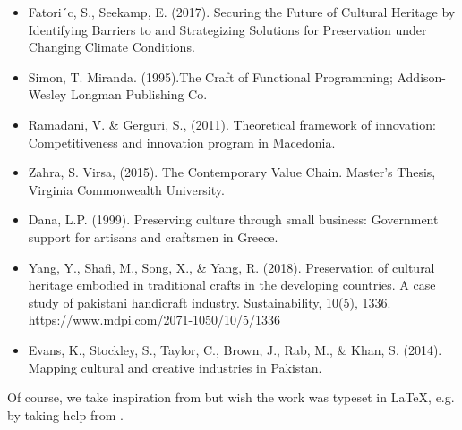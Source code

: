 \begin{itemize}
\item Fatori´c, S., Seekamp, E. (2017). Securing the Future of Cultural Heritage by Identifying Barriers to and Strategizing Solutions for Preservation under Changing Climate Conditions. 

\item Simon, T. Miranda. (1995).The Craft of Functional Programming; Addison-Wesley Longman Publishing Co.

\item Ramadani, V. \& Gerguri, S., (2011).  Theoretical framework of innovation: Competitiveness and innovation program in Macedonia.

\item Zahra, S. Virsa, (2015). The Contemporary Value Chain. Master’s Thesis, Virginia Commonwealth University.

\item Dana, L.P. (1999). Preserving culture through small business: Government support for artisans and craftsmen in Greece. 

\item Yang, Y., Shafi, M., Song, X., \& Yang, R. (2018). Preservation of cultural heritage embodied in traditional crafts in the developing countries. A case study of pakistani handicraft industry. Sustainability, 10(5), 1336. https://www.mdpi.com/2071-1050/10/5/1336

\item Evans, K., Stockley, S., Taylor, C., Brown, J., Rab, M., \& Khan, S. (2014). Mapping cultural and creative industries in Pakistan. 


\end{itemize}
Of course, we take inspiration from \cite{einstein} but wish the work was typeset in \LaTeX \cite{knuthwebsite}, e.g. by taking help from \cite{latexcompanion}.